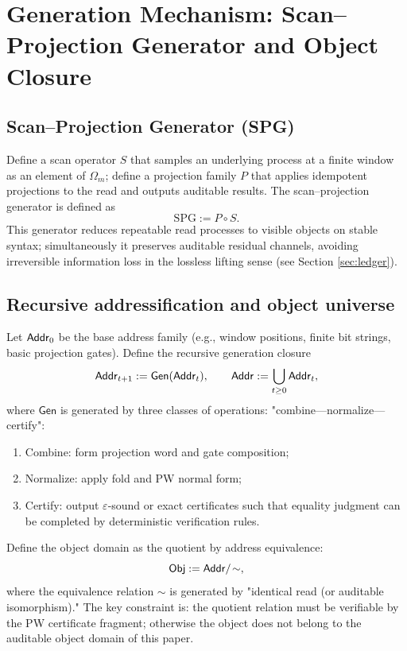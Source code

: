 \section{Generation Mechanism: Scan--Projection Generator and Object Closure}

\subsection{Scan--Projection Generator (SPG)}
Define a scan operator $S$ that samples an underlying process at a finite window as an element of $\Omega_m$; define a projection family $P$ that applies idempotent projections to the read and outputs auditable results. The scan--projection generator is defined as
$$
\mathrm{SPG} := P\circ S.
$$
This generator reduces repeatable read processes to visible objects on stable syntax; simultaneously it preserves auditable residual channels, avoiding irreversible information loss in the lossless lifting sense (see Section \ref{sec:ledger}).\par

\subsection{Recursive addressification and object universe}
Let $\mathsf{Addr}_0$ be the base address family (e.g., window positions, finite bit strings, basic projection gates). Define the recursive generation closure
$$
\mathsf{Addr}_{t+1} := \mathsf{Gen}(\mathsf{Addr}_t),
\qquad
\mathsf{Addr} := \bigcup_{t\ge 0}\mathsf{Addr}_t,
$$
where $\mathsf{Gen}$ is generated by three classes of operations: "combine—normalize—certify":
\begin{enumerate}
  \item Combine: form projection word and gate composition;
  \item Normalize: apply fold and PW normal form;
  \item Certify: output $\varepsilon$-sound or exact certificates such that equality judgment can be completed by deterministic verification rules.
\end{enumerate}

Define the object domain as the quotient by address equivalence:
$$
\mathsf{Obj} := \mathsf{Addr}/\!\sim,
$$
where the equivalence relation $\sim$ is generated by "identical read (or auditable isomorphism)." The key constraint is: the quotient relation must be verifiable by the PW certificate fragment; otherwise the object does not belong to the auditable object domain of this paper.\par
